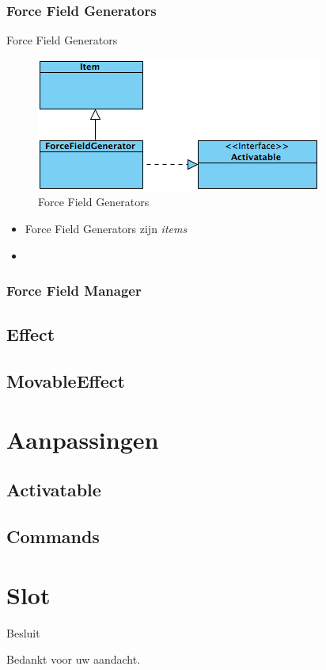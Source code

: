 \documentclass[t]{beamer}
\begin{document}
\subsubsection{Force Field Generators}
\begin{frame}{Force Field Generators}
\begin{figure}
	\center
	\includegraphics[width= 0.4\linewidth]{img/forcefieldgenerator.png}
	\caption{Force Field Generators}
\end{figure}
\begin{itemize}
	\item Force Field Generators zijn \textit{items}
	\item 
\end{itemize}
\end{frame}

\subsubsection{Force Field Manager}

\subsection{Effect}

\subsection{MovableEffect}


\section{Aanpassingen}

\subsection{Activatable}
\subsection{Commands}



\section{Slot}
\begin{frame}{Besluit}
\vspace{0.8in}
\begin{center}
Bedankt voor uw aandacht.
\end{center}
\end{frame}
\end{document}
